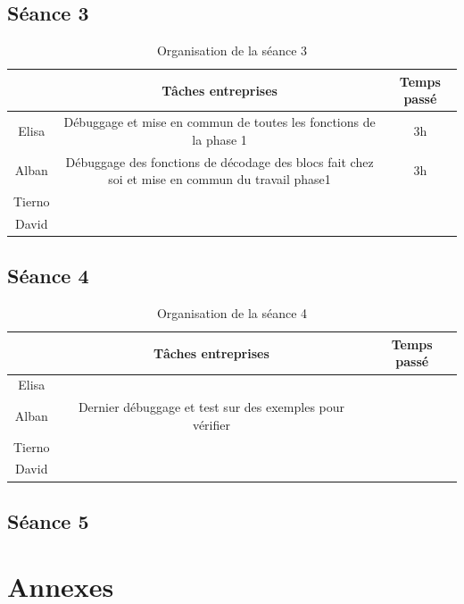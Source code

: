 \documentclass{rapport}
\begin{document}
\subsection{Séance 3}

\begin{table}[htbp]
	\centering 
	\begin{tabular}{c|c|c}
		& Tâches entreprises& Temps passé\\ \hline
		Elisa& Débuggage et mise en commun de toutes les fonctions de la phase 1 & 3h\\ \hline
		Alban& Débuggage des fonctions de décodage des blocs fait chez soi et mise en commun du travail phase1& 3h\\ \hline
		Tierno& & \\ \hline
		David& & 
	\end{tabular}
	\caption{Organisation de la séance 3}
\end{table}

\subsection{Séance 4}

\begin{table}[htbp]
	\centering 
	\begin{tabular}{c|c|c}
		& Tâches entreprises& Temps passé\\ \hline
		Elisa& & \\ \hline
		Alban& Dernier débuggage et test sur des exemples pour vérifier& \\ \hline
		Tierno& & \\ \hline
		David& & 
	\end{tabular}
	\caption{Organisation de la séance 4}
\end{table}

\subsection{Séance 5} %

\newpage

\section{Annexes}

\lstset{style=mystyle}
\end{document}
